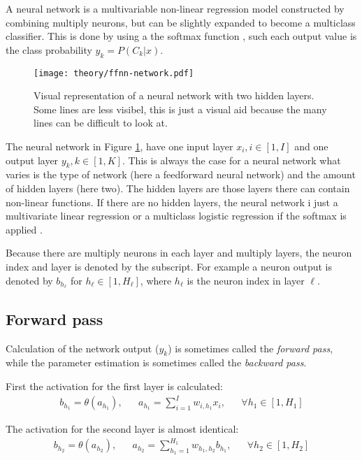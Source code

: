 A neural network is a multivariable non-linear regression model constructed by combining multiply neurons, but can be slightly expanded to become a multiclass classifier. This is done by using a the softmax function \cite{the-elements-of-statistical-learning}, such each output value is the class probability $y_k = P(C_k | x)$.

\begin{figure}[h]
	\centering
	\texttt{[image: theory/ffnn-network.pdf]}
	\caption{Visual representation of a neural network with two hidden layers. Some lines are less visibel, this is just a visual aid because the many lines can be difficult to look at.}
	\label{fig:theory:ffnn:network}
\end{figure}

The neural network in Figure \ref{fig:theory:ffnn:network}, have one input layer $x_i, i \in [1, I]$ and one output layer $y_k, k \in [1, K]$. This is always the case for a neural network what varies is the type of network (here a feedforward neural network) and the amount of hidden layers (here two). The hidden layers are those layers there can contain non-linear functions. If there are no hidden layers, the neural network i just a multivariate linear regression or a multiclass logistic regression if the softmax is applied \cite{bishop}.

Because there are multiply neurons in each layer and multiply layers, the neuron index and layer is denoted by the subscript. For example a neuron output is denoted by $b_{h_{\ell}}$ for $h_{\ell} \in [1, H_{\ell}]$, where $h_{\ell}$ is the neuron index in layer $\ell$.

\subsection{Forward pass}

Calculation of the network output ($y_k$) is sometimes called the \textit{forward pass}, while the parameter estimation is sometimes called the \textit{backward pass}.

First the activation for the first layer is calculated:
\begin{equation}
\begin{aligned}
b_{h_1} = \theta(a_{h_1}), && a_{h_1} = \sum_{i = 1}^I w_{i, h_1} x_i, && \forall h_1 \in [1, H_1]
\end{aligned}
\end{equation}

The activation for the second layer is almost identical:
\begin{equation}
\begin{aligned}
b_{h_2} = \theta(a_{h_2}), && a_{h_2} = \sum_{h_1 = 1}^{H_1} w_{h_1, h_2} b_{h_1}, && \forall h_2 \in [1, H_2]
\end{aligned}
\end{equation}


